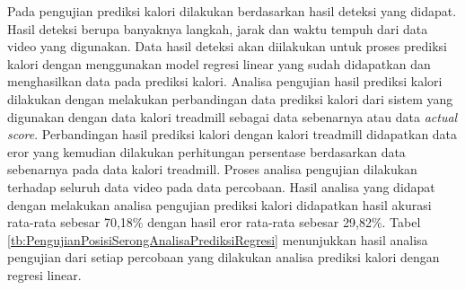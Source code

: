 Pada pengujian prediksi kalori dilakukan berdasarkan hasil deteksi yang didapat. Hasil deteksi berupa banyaknya langkah, jarak dan waktu tempuh dari data video yang digunakan. Data hasil deteksi akan diilakukan untuk proses prediksi kalori dengan menggunakan model regresi linear yang sudah didapatkan dan menghasilkan data pada prediksi kalori. Analisa pengujian hasil prediksi kalori dilakukan dengan melakukan perbandingan data prediksi kalori dari sistem yang digunakan dengan data kalori treadmill sebagai data sebenarnya atau data \emph{actual score}. Perbandingan hasil prediksi kalori dengan kalori treadmill didapatkan data eror yang kemudian dilakukan perhitungan persentase berdasarkan data sebenarnya pada data kalori treadmill. Proses analisa pengujian dilakukan terhadap seluruh data video pada data percobaan. Hasil analisa yang didapat dengan melakukan analisa pengujian prediksi kalori didapatkan hasil akurasi rata-rata sebesar 70,18\% dengan hasil eror rata-rata sebesar 29,82\%. Tabel \ref{tb:PengujianPosisiSerongAnalisaPrediksiRegresi} menunjukkan hasil analisa pengujian dari setiap percobaan yang dilakukan analisa prediksi kalori dengan regresi linear.


